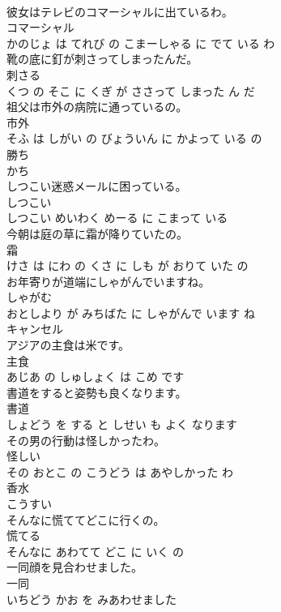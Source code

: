 \documentclass[8pt]{extreport}
\begin{document}
\begin{CJK}{UTF8}{min}
\\	彼女はテレビのコマーシャルに出ているわ。	
\\	コマーシャル 
\\	かのじょ は てれび の こまーしゃる に でて いる わ			
\\	靴の底に釘が刺さってしまったんだ。	
\\	刺さる 
\\	くつ の そこ に くぎ が ささって しまった ん だ			
\\	祖父は市外の病院に通っているの。	
\\	市外 
\\	そふ は しがい の びょういん に かよって いる の			
\\	勝ち	
\\	かち			
\\	しつこい迷惑メールに困っている。	
\\	しつこい 
\\	しつこい めいわく めーる に こまって いる			
\\	今朝は庭の草に霜が降りていたの。	
\\	霜 
\\	けさ は にわ の くさ に しも が おりて いた の			
\\	お年寄りが道端にしゃがんでいますね。	
\\	しゃがむ 
\\	おとしより が みちばた に しゃがんで います ね			
\\	キャンセル	
\\	アジアの主食は米です。	
\\	主食 
\\	あじあ の しゅしょく は こめ です			
\\	書道をすると姿勢も良くなります。	
\\	書道 
\\	しょどう を する と しせい も よく なります			
\\	その男の行動は怪しかったわ。	
\\	怪しい 
\\	その おとこ の こうどう は あやしかった わ			
\\	香水	
\\	こうすい			
\\	そんなに慌ててどこに行くの。	
\\	慌てる 
\\	そんなに あわてて どこ に いく の			
\\	一同顔を見合わせました。	
\\	一同 
\\	いちどう かお を みあわせました			

\end{CJK}
\end{document}
